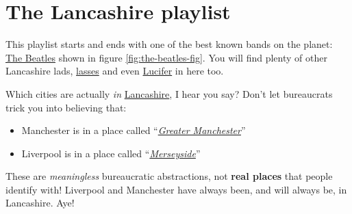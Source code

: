 \documentclass[
]{book}
\providecommand{\tightlist}{%
  \setlength{\itemsep}{0pt}\setlength{\parskip}{0pt}}
\begin{document}
\hypertarget{lancashire}{%
\section{The Lancashire playlist}\label{lancashire}}

This playlist starts and ends with one of the best known bands on the planet: \href{https://en.wikipedia.org/wiki/The_Beatles}{The Beatles} shown in figure \ref{fig:the-beatles-fig}. You will find plenty of other Lancashire lads, \href{https://en.wikipedia.org/wiki/Lass}{lasses} and even \href{https://en.wikipedia.org/wiki/Lucifer}{Lucifer} in here too. \citep{luciferoverlancs}

Which cities are actually \emph{in} \href{https://en.wikipedia.org/wiki/Lancashire}{Lancashire}, I hear you say? Don't let bureaucrats trick you into believing that:

\begin{itemize}
\tightlist
\item
  Manchester is in a place called ``\emph{\href{https://en.wikipedia.org/wiki/Greater_Manchester}{Greater Manchester}}''
\item
  Liverpool is in a place called ``\emph{\href{https://en.wikipedia.org/wiki/Merseyside}{Merseyside}}''
\end{itemize}

These are \emph{meaningless} bureaucratic abstractions, not \textbf{real places} that people identify with! Liverpool and Manchester have always been, and will always be, in Lancashire. Aye! \citep{northerners}
\end{document}
